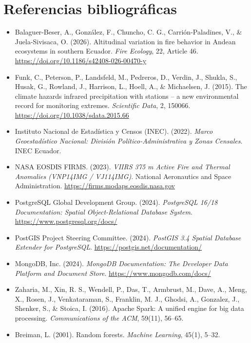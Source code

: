 \documentclass[11pt,a4paper]{article}
\begin{document}
\section{Referencias bibliogr\'aficas}

\footnotesize
\begin{itemize}[leftmargin=1.5em]
    \item Balaguer-Beser, A., Gonz\'alez, F., Chuncho, C. G., Carri\'on-Paladines, V., \& Juela-Sivisaca, O. (2026). Altitudinal variation in fire behavior in Andean ecosystems in southern Ecuador. \textit{Fire Ecology}, 22, Article 46. \url{https://doi.org/10.1186/s42408-026-00470-y}
    \item Funk, C., Peterson, P., Landsfeld, M., Pedreros, D., Verdin, J., Shukla, S., Husak, G., Rowland, J., Harrison, L., Hoell, A., \& Michaelsen, J. (2015). The climate hazards infrared precipitation with stations -- a new environmental record for monitoring extremes. \textit{Scientific Data}, 2, 150066. \url{https://doi.org/10.1038/sdata.2015.66}
    \item Instituto Nacional de Estad\'istica y Censos (INEC). (2022). \textit{Marco Geoestad\'istico Nacional: Divisi\'on Pol\'itico-Administrativa y Zonas Censales}. INEC Ecuador.
    \item NASA EOSDIS FIRMS. (2023). \textit{VIIRS 375 m Active Fire and Thermal Anomalies (VNP14IMG / VJ114IMG)}. National Aeronautics and Space Administration. \url{https://firms.modaps.eosdis.nasa.gov}
    \item PostgreSQL Global Development Group. (2024). \textit{PostgreSQL 16/18 Documentation: Spatial Object-Relational Database System}. \url{https://www.postgresql.org/docs/}
    \item PostGIS Project Steering Committee. (2024). \textit{PostGIS 3.4 Spatial Database Extender for PostgreSQL}. \url{https://postgis.net/documentation/}
    \item MongoDB, Inc. (2024). \textit{MongoDB Documentation: The Developer Data Platform and Document Store}. \url{https://www.mongodb.com/docs/}
    \item Zaharia, M., Xin, R. S., Wendell, P., Das, T., Armbrust, M., Dave, A., Meng, X., Rosen, J., Venkataraman, S., Franklin, M. J., Ghodsi, A., Gonzalez, J., Shenker, S., \& Stoica, I. (2016). Apache Spark: A unified engine for big data processing. \textit{Communications of the ACM}, 59(11), 56--65.
    \item Breiman, L. (2001). Random forests. \textit{Machine Learning}, 45(1), 5--32.
\end{itemize}
\normalsize
\end{document}
